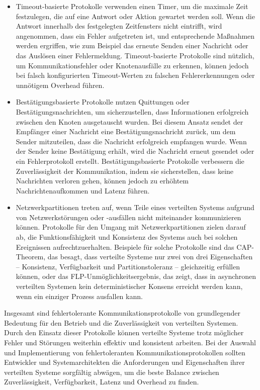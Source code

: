 \documentclass[../vs-script-first-v01.tex]{subfiles}
\begin{document}
\begin{itemize}
\item Timeout-basierte Protokolle verwenden einen Timer, um die maximale Zeit festzulegen, die auf eine Antwort oder Aktion gewartet werden soll. Wenn die Antwort innerhalb des festgelegten Zeitfensters nicht eintrifft, wird angenommen, dass ein Fehler aufgetreten ist, und entsprechende Maßnahmen werden ergriffen, wie zum Beispiel das erneute Senden einer Nachricht oder das Auslösen einer Fehlermeldung. Timeout-basierte Protokolle sind nützlich, um Kommunikationsfehler oder Knotenausfälle zu erkennen, können jedoch bei falsch konfigurierten Timeout-Werten zu falschen Fehlererkennungen oder unnötigem Overhead führen.
\item Bestätigungsbasierte Protokolle nutzen Quittungen oder Bestätigungsnachrichten, um sicherzustellen, dass Informationen erfolgreich zwischen den Knoten ausgetauscht wurden. Bei diesem Ansatz sendet der Empfänger einer Nachricht eine Bestätigungsnachricht zurück, um dem Sender mitzuteilen, dass die Nachricht erfolgreich empfangen wurde. Wenn der Sender keine Bestätigung erhält, wird die Nachricht erneut gesendet oder ein Fehlerprotokoll erstellt. Bestätigungsbasierte Protokolle verbessern die Zuverlässigkeit der Kommunikation, indem sie sicherstellen, dass keine Nachrichten verloren gehen, können jedoch zu erhöhtem Nachrichtenaufkommen und Latenz führen.
\item Netzwerkpartitionen treten auf, wenn Teile eines verteilten Systems aufgrund von Netzwerkstörungen oder -ausfällen nicht miteinander kommunizieren können. Protokolle für den Umgang mit Netzwerkpartitionen zielen darauf ab, die Funktionsfähigkeit und Konsistenz des Systems auch bei solchen Ereignissen aufrechtzuerhalten. Beispiele für solche Protokolle sind das CAP-Theorem, das besagt, dass verteilte Systeme nur zwei von drei Eigenschaften – Konsistenz, Verfügbarkeit und Partitionstoleranz – gleichzeitig erfüllen können, oder das FLP-Unmöglichkeitsergebnis, das zeigt, dass in asynchronen verteilten Systemen kein deterministischer Konsens erreicht werden kann, wenn ein einziger Prozess ausfallen kann.
\end{itemize}
Insgesamt sind fehlertolerante Kommunikationsprotokolle von grundlegender Bedeutung für den Betrieb und die Zuverlässigkeit von verteilten Systemen. Durch den Einsatz dieser Protokolle können verteilte Systeme trotz möglicher Fehler und Störungen weiterhin effektiv und konsistent arbeiten. Bei der Auswahl und Implementierung von fehlertoleranten Kommunikationsprotokollen sollten Entwickler und Systemarchitekten die Anforderungen und Eigenschaften ihrer verteilten Systeme sorgfältig abwägen, um die beste Balance zwischen Zuverlässigkeit, Verfügbarkeit, Latenz und Overhead zu finden.
\end{document}
